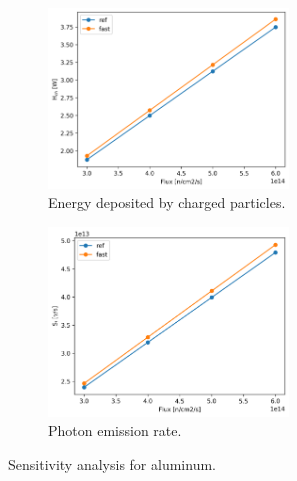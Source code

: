 \begin{figure}[htbp!] %
  \centering
  \begin{subfigure}[b]{0.49\textwidth}
    \centering
    \includegraphics[width=0.7\textwidth]{figures/fast-res13_hch}
    \caption{Energy deposited by charged particles.}
  \end{subfigure}
  \hfill
  \begin{subfigure}[b]{0.49\textwidth}
    \centering
    \includegraphics[width=0.7\textwidth]{figures/fast-res13_Si}
    \caption{Photon emission rate.}
  \end{subfigure}
  \hfill
  \caption{Sensitivity analysis for aluminum.}
  \label{fig:sens-al}
\end{figure}

